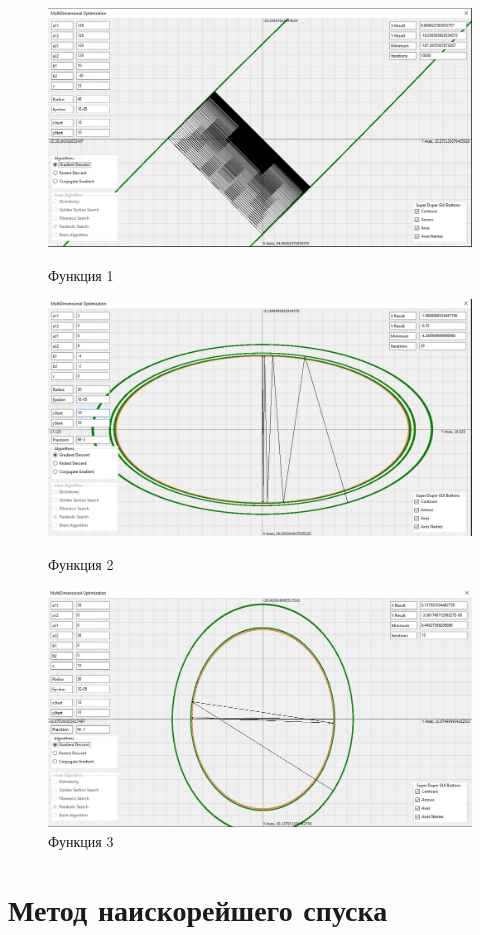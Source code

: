 \documentclass[12pt]{article}
\begin{document}
\begin{figure}[H]
	\centering
	\includegraphics[scale=0.3]{img/1_simp.png}
	\caption{Функция 1}
	\includegraphics[scale=0.3]{img/2_simp.png}
	\caption{Функция 2}
	\includegraphics[scale=0.3]{img/3_simp.png}
	\caption{Функция 3}
\end{figure}

\newpage
\section{Метод наискорейшего спуска}
\end{document}
